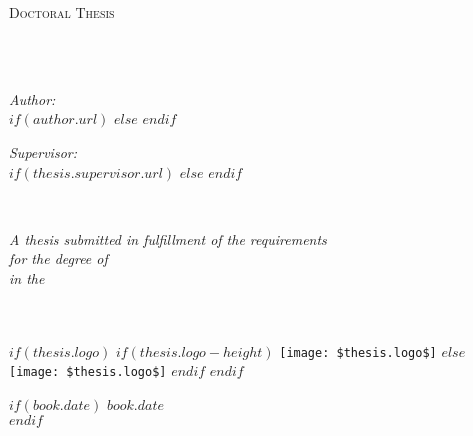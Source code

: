   \begin{titlepage}
  \begin{center}
  
  \vspace*{.06\textheight}
  {\scshape\LARGE \univname\par}\vspace{1.5cm} %
  \textsc{\Large Doctoral Thesis}\\[0.5cm] %
  
  \HRule \\[0.4cm] %
  {\huge \bfseries \ttitle\par}\vspace{0.4cm} %
  \HRule \\[1.5cm] %
   
  \begin{minipage}[t]{0.4\textwidth}
  \begin{flushleft} \large
  \emph{Author:}\\
  $if(author.url)$
  \href{$author.url$}{\authorname} %
  $else$
  \authorname
  $endif$
  \end{flushleft}
  \end{minipage}
  \begin{minipage}[t]{0.4\textwidth}
  \begin{flushright} \large
  \emph{Supervisor:} \\ 
  $if(thesis.supervisor.url)$%
  \href{$thesis.supervisor.url$}{\supname} %
  $else$%
  \supname
  $endif$
  \end{flushright}
  \end{minipage}\\[3cm]
   
  \vfill
  
  \large \textit{A thesis submitted in fulfillment of the requirements\\ for the degree of \degreename}\\[0.3cm] %
  \textit{in the}\\[0.4cm]
  \groupname\\
  \deptname\\[2cm] %
   
  \vfill
  
  $if(thesis.logo)$
  $if(thesis.logo-height)$
  \texttt{[image: \$thesis.logo\$]} %
  $else$
  \texttt{[image: \$thesis.logo\$]}
  $endif$
  $endif$
  
  $if(book.date)$
  {\large $book.date$}\\[4cm] %
  $endif$
  
  \vfill
  \end{center}
  \end{titlepage}
\fi
\makeatother